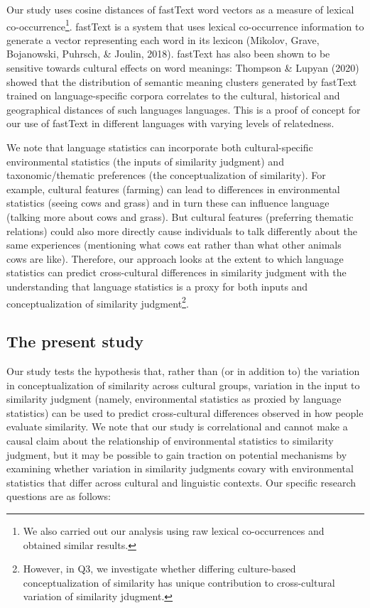 \documentclass[10pt, letterpaper]{article}
\begin{document}
Our study uses cosine distances of fastText word vectors as a measure of
lexical co-occurrence\footnote{We also carried out our analysis using
  raw lexical co-occurrences and obtained similar results.}. fastText is
a system that uses lexical co-occurrence information to generate a
vector representing each word in its lexicon (Mikolov, Grave,
Bojanowski, Puhrsch, \& Joulin, 2018). fastText has also been shown to
be sensitive towards cultural effects on word meanings: Thompson \&
Lupyan (2020) showed that the distribution of semantic meaning clusters
generated by fastText trained on language-specific corpora correlates to
the cultural, historical and geographical distances of such languages
languages. This is a proof of concept for our use of fastText in
different languages with varying levels of relatedness.

We note that language statistics can incorporate both cultural-specific
environmental statistics (the inputs of similarity judgment) and
taxonomic/thematic preferences (the conceptualization of similarity).
For example, cultural features (farming) can lead to differences in
environmental statistics (seeing cows and grass) and in turn these can
influence language (talking more about cows and grass). But cultural
features (preferring thematic relations) could also more directly cause
individuals to talk differently about the same experiences (mentioning
what cows eat rather than what other animals cows are like). Therefore,
our approach looks at the extent to which language statistics can
predict cross-cultural differences in similarity judgment with the
understanding that language statistics is a proxy for both inputs and
conceptualization of similarity judgment\footnote{However, in Q3, we
  investigate whether differing culture-based conceptualization of
  similarity has unique contribution to cross-cultural variation of
  similarity jdugment.}.

\hypertarget{the-present-study}{%
\subsection{The present study}\label{the-present-study}}

Our study tests the hypothesis that, rather than (or in addition to) the
variation in conceptualization of similarity across cultural groups,
variation in the input to similarity judgment (namely, environmental
statistics as proxied by language statistics) can be used to predict
cross-cultural differences observed in how people evaluate similarity.
We note that our study is correlational and cannot make a causal claim
about the relationship of environmental statistics to similarity
judgment, but it may be possible to gain traction on potential
mechanisms by examining whether variation in similarity judgments covary
with environmental statistics that differ across cultural and linguistic
contexts. Our specific research questions are as follows:~
\end{document}
